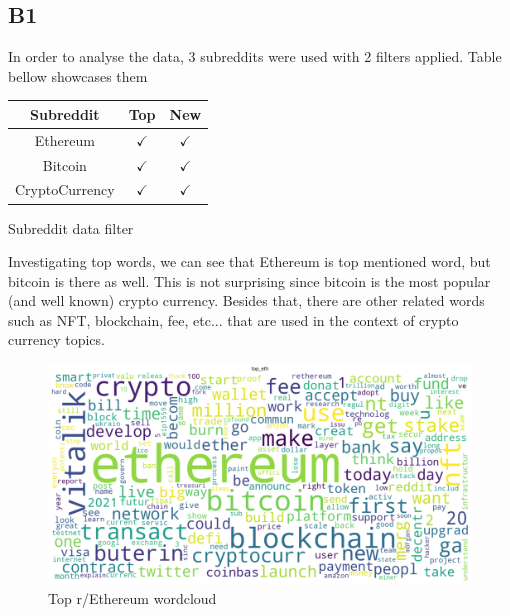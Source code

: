 \subsection{B1}\label{B1}

In order to analyse the data, 3 subreddits were used with 2 filters applied. Table bellow showcases them

\begin{center}
\begin{tabular}{|c|c|c|}
    \hline
    Subreddit & Top & New \\
    \hline
    Ethereum & $\checkmark$ & $\checkmark$ \\
    \hline
    Bitcoin & $\checkmark$ & $\checkmark$ \\
    \hline
    CryptoCurrency & $\checkmark$ & $\checkmark$ \\
    \hline
\end{tabular}
\end{center}

\begin{table}[htbp]
\caption{Subreddit data filter}
\label{tab:Subreddits}
\end{table}


\begin{landscape}
Investigating top words, we can see that Ethereum is top mentioned word, but bitcoin is there as well. This is not surprising since bitcoin is the most popular (and well known) crypto currency. Besides that, there are other related words such as NFT, blockchain, fee, etc... that are used in the context of crypto currency topics.

\begin{figure}[H]
\includegraphics[scale=0.55]{img/B1/top_eth_wordcloud.png}
\centering
\caption{Top r/Ethereum wordcloud}
\label{fig:top_eth_wordcloud}
\end{figure}
\end{landscape}

